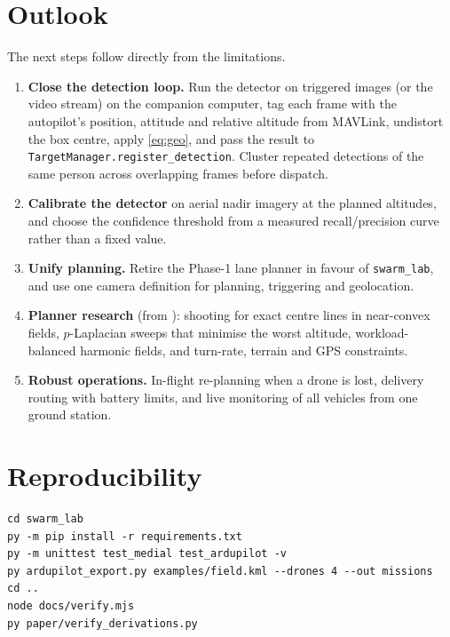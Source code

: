 \documentclass[11pt,a4paper]{article}
\newcommand{\code}[1]{\texttt{#1}}
\begin{document}
\section{Outlook}

The next steps follow directly from the limitations.

\begin{enumerate}
  \item \textbf{Close the detection loop.} Run the detector on triggered images (or the video stream) on the
        companion computer, tag each frame with the autopilot's position, attitude and relative altitude
        from MAVLink, undistort the box centre, apply \eqref{eq:geo}, and pass the result to
        \code{TargetManager.register\_detection}. Cluster repeated detections of the same person across
        overlapping frames before dispatch.
  \item \textbf{Calibrate the detector} on aerial nadir imagery at the planned altitudes, and choose the
        confidence threshold from a measured recall/precision curve rather than a fixed value.
  \item \textbf{Unify planning.} Retire the Phase-1 lane planner in favour of \code{swarm\_lab}, and use one
        camera definition for planning, triggering and geolocation.
  \item \textbf{Planner research} (from \cite{coverage}): shooting for exact centre lines in near-convex
        fields, $p$-Laplacian sweeps that minimise the worst altitude, workload-balanced harmonic fields,
        and turn-rate, terrain and GPS constraints.
  \item \textbf{Robust operations.} In-flight re-planning when a drone is lost, delivery routing with battery
        limits, and live monitoring of all vehicles from one ground station.
\end{enumerate}

\section*{Reproducibility}

\begin{lstlisting}
cd swarm_lab
py -m pip install -r requirements.txt
py -m unittest test_medial test_ardupilot -v
py ardupilot_export.py examples/field.kml --drones 4 --out missions
cd ..
node docs/verify.mjs
py paper/verify_derivations.py
\end{lstlisting}
\end{document}
